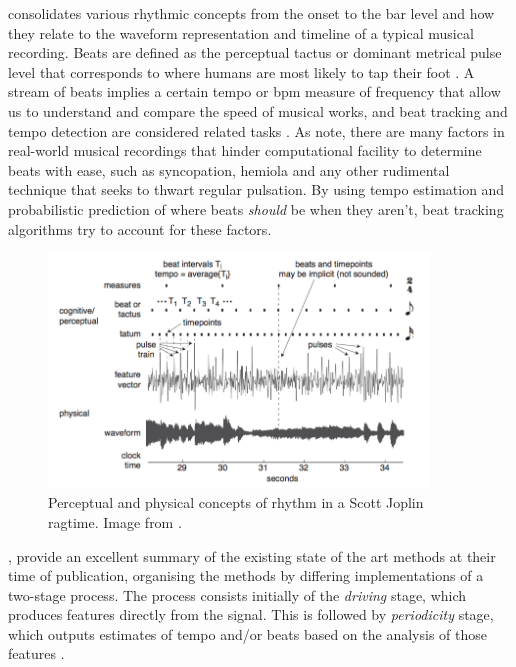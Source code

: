 { consolidates various rhythmic concepts from the onset to the bar level and how they relate to the waveform representation and timeline of a typical musical recording. Beats are defined as the perceptual tactus or dominant metrical pulse level that corresponds to where humans are most likely to tap their foot \citep{Jehan2005, Ellis2007a, Stark2009}. A stream of beats implies a certain tempo or \acrlong{bpm} measure of frequency that allow us to understand and compare the speed of musical works, and beat tracking and tempo detection are considered related tasks \citep{McKinney2007}. As \cite{Korzeniowski2014} note, there are many factors in real-world musical recordings that hinder computational facility to determine beats with ease, such as syncopation, hemiola and any other rudimental technique that seeks to thwart regular pulsation. By using tempo estimation and probabilistic prediction of where beats \textit{should} be when they aren't, beat tracking algorithms try to account for these factors. 

\begin{figure}
	\begin{center}
		\includegraphics[width=0.9\textwidth]{ch05_pyconcat/figures/joplin.png}
	\end{center}
	\caption[Perceptual and physical concepts of rhythm in a Scott Joplin ragtime]{Perceptual and physical concepts of rhythm in a Scott Joplin ragtime. Image from \cite{Sethares2007}.}
	\label{fig:beat_joplin}
\end{figure}

\cite{McKinney2007}, provide an excellent summary of the existing state of the art methods at their time of publication, organising the methods by differing implementations of a two-stage process. The process consists initially of the \textit{driving} stage, which produces features directly from the signal. This is followed by \textit{periodicity} stage, which outputs estimates of tempo and/or beats based on the analysis of those features \citep{McKinney2007}.

}
